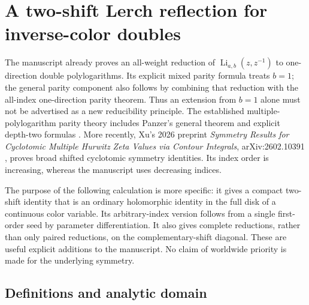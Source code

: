 
\section{A two-shift Lerch reflection for inverse-color doubles}
\label{gap:sec:main}\label{sec:gap}

The manuscript already proves an all-weight reduction of
$\operatorname{Li}_{a,b}(z,z^{-1})$ to one-direction double
polylogarithms. Its explicit mixed parity formula treats $b=1$; the
general parity component also follows by combining that reduction with
the all-index one-direction parity theorem. Thus an extension from
$b=1$ alone must not be advertised as a new reducibility principle.
The established multiple-polylogarithm parity theory includes Panzer's
general theorem and explicit depth-two formulas \cite{panzer}. More recently, Xu's
2026 preprint \emph{Symmetry Results for Cyclotomic Multiple Hurwitz
Zeta Values via Contour Integrals}, arXiv:2602.10391 \cite{xu}, proves broad
shifted cyclotomic symmetry identities. Its index order is increasing,
whereas the manuscript uses decreasing indices.

The purpose of the following calculation is more specific: it gives a
compact two-shift identity that is an ordinary holomorphic identity in
the full disk of a continuous color variable. Its arbitrary-index
version follows from a single first-order seed by parameter
differentiation. It also gives complete reductions, rather than only
paired reductions, on the complementary-shift diagonal. These are
useful explicit additions to the manuscript. No claim of worldwide
priority is made for the underlying symmetry.

\subsection{Definitions and analytic domain}

